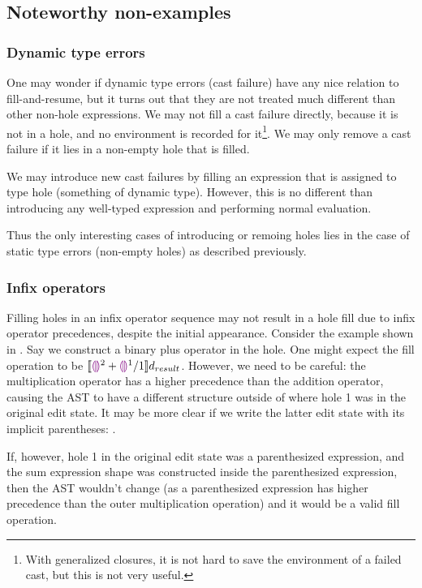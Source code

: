 \subsection{Noteworthy non-examples}
\label{sec:far-nonexamples}

\subsubsection{Dynamic type errors}
\label{sec:far-dynamic-type-errors}

One may wonder if dynamic type errors (cast failure) have any nice relation to fill-and-resume, but it turns out that they are not treated much different than other non-hole expressions. We may not fill a cast failure directly, because it is not in a hole, and no environment is recorded for it\footnote{With generalized closures, it is not hard to save the environment of a failed cast, but  this is not very useful.}. We may only remove a cast failure if it lies in a non-empty hole that is filled.

We may introduce new cast failures by filling an expression that is assigned to type hole (something of dynamic type). However, this is no different than introducing any well-typed expression and performing normal evaluation.

Thus the only interesting cases of introducing or remoing holes lies in the case of static type errors (non-empty holes) as described previously.

\subsubsection{Infix operators}
\label{sec:far-infix-operators}

Filling holes in an infix operator sequence may not result in a hole fill due to infix operator precedences, despite the initial appearance. Consider the example shown in . Say we construct a binary plus operator in the hole. One might expect the fill operation to be $\llbracket{}\textcolor{violet}{\llparenthesis}\textcolor{violet}{\rrparenthesis}^2+\textcolor{violet}{\llparenthesis}\textcolor{violet}{\rrparenthesis}^1/1\rrbracket{}d_{result}$. However, we need to be careful: the multiplication operator has a higher precedence than the addition operator, causing the AST to have a different structure outside of where hole 1 was in the original edit state. It may be more clear if we write the latter edit state with its implicit parentheses: .

If, however, hole 1 in the original edit state was a parenthesized expression, and the sum expression shape was constructed inside the parenthesized expression, then the AST wouldn't change (as a parenthesized expression has higher precedence than the outer multiplication operation) and it would be a valid fill operation.

